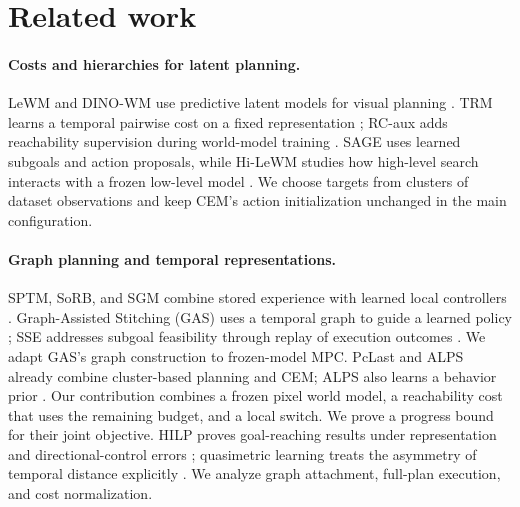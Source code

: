 \documentclass{article} %
\theoremstyle{definition}
\theoremstyle{remark}
\newcommand{\keypoints}[1]{\par\medskip\noindent\fcolorbox{black!50}{black!5}{\begin{minipage}{0.96\linewidth}\small
\textbf{Key points this section must land.}\begin{itemize}[nosep,leftmargin=1.2em]#1\end{itemize}\end{minipage}}\par\medskip}
\begin{document}
\section{Related work}
\label{sec:related}

\paragraph{Costs and hierarchies for latent planning.}
LeWM and DINO-WM use predictive latent models for visual planning \citep{lewm,dinowm}.
TRM learns a temporal pairwise cost on a fixed representation \citep{trm};
RC-aux adds reachability supervision during world-model training \citep{rcaux}.
SAGE uses learned subgoals and action proposals, while Hi-LeWM studies how high-level
search interacts with a frozen low-level model \citep{sage,hilewm}.
We choose targets from clusters of dataset observations and keep CEM's action
initialization unchanged in the main configuration.

\paragraph{Graph planning and temporal representations.}
SPTM, SoRB, and SGM combine stored experience with learned local controllers
\citep{sptm,sorb,sgm}. Graph-Assisted Stitching (GAS) uses a temporal graph to guide a learned
policy \citep{gas};
SSE addresses subgoal feasibility through replay of execution outcomes \citep{sse}.
We adapt GAS's graph construction to frozen-model MPC.
PcLast and ALPS already combine cluster-based planning and CEM; ALPS also learns a
behavior prior \citep{pclast,alps}. Our contribution combines a frozen pixel world model,
a reachability cost that uses the remaining budget, and a local switch. We prove a
progress bound for their joint objective.
HILP proves goal-reaching results under representation and directional-control errors
\citep{hilp}; quasimetric learning treats the asymmetry of temporal distance explicitly
\citep{qrl}. We analyze graph attachment, full-plan execution, and cost normalization.
\end{document}
